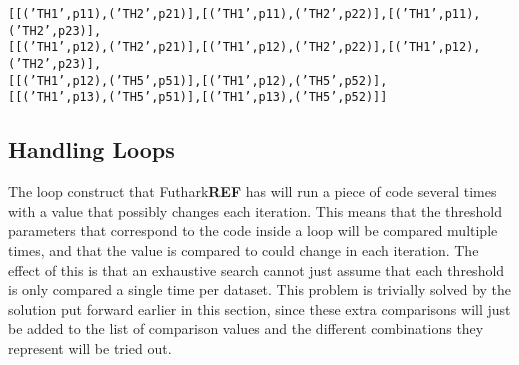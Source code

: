 {\centering
  \texttt{[[('TH1',p11),('TH2',p21)],[('TH1',p11),('TH2',p22)],[('TH1',p11),('TH2',p23)],}\\
  \texttt{[[('TH1',p12),('TH2',p21)],[('TH1',p12),('TH2',p22)],[('TH1',p12),('TH2',p23)],}\\
  \texttt{[[('TH1',p12),('TH5',p51)],[('TH1',p12),('TH5',p52)],}\\
  \texttt{[[('TH1',p13),('TH5',p51)],[('TH1',p13),('TH5',p52)]]}\\
}


\subsection{Handling Loops}
The loop construct that Futhark\textbf{REF} has will run a piece of code several times with
a value that possibly changes each iteration. This means that the threshold
parameters that correspond to the code inside a loop will be compared multiple
times, and that the value is compared to could change in each iteration. The
effect of this is that an exhaustive search cannot just assume that each
threshold is only compared a single time per dataset. This problem is
trivially solved by the solution put forward earlier in this section, since
these extra comparisons will just be added to the list of comparison values and
the different combinations they represent will be tried out.
